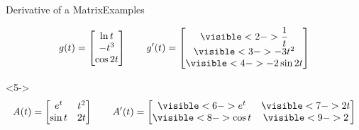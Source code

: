 \documentclass{beamer}
\begin{document}
\begin{frame}{Derivative of a Matrix}{Examples}
\begin{example}
\centering
\begin{equation*}
g(t)=
\begin{bmatrix}
\ln t\\
-t^3\\
\cos 2t
\end{bmatrix}
\qquad g^\prime(t)=
\begin{bmatrix}
\visible<2->{\dfrac{1}{t}}\\
\visible<3->{-3t^2}\\
\visible<4->{-2\sin 2t}
\end{bmatrix}
\end{equation*}
\end{example}
\pause
\begin{example}<5->
\centering
\begin{equation*}
A(t)=
\begin{bmatrix}
e^t & t^2\\
\sin t & 2t
\end{bmatrix}
\qquad A^\prime(t)=
\begin{bmatrix}
\visible<6->{e^t} & \visible<7->{2t}\\
\visible<8->{\cos t} & \visible<9->{2}
\end{bmatrix}
\end{equation*}
\end{example}
\end{frame}
\end{document}

